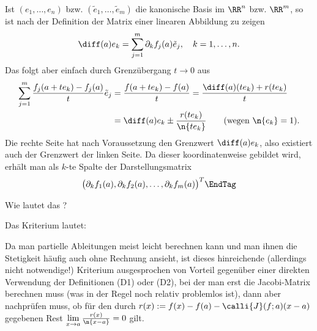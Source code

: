 \begin{antwort}
  Ist $( e_1,\ldots, e_n )$ bzw. $( \tilde{e}_1, \ldots , \tilde{e}_m )$ 
  die kanonische Basis im $\RR^n$ bzw. $\RR^m$, so ist nach der Definition 
  der Matrix einer linearen Abbildung zu zeigen
  \[
  \diff (a) e_k = \sum_{j=1}^m \partial_k f_j(a) \tilde{e}_j, \quad k=1,\ldots,n.
  \]
  Das folgt aber einfach durch Grenzübergang $t\to 0$ aus
  \begin{align*}
    \sum_{j=1}^m \frac{f_j(a+te_k)-f_j(a)}{t} \tilde{e}_j &= 
    \frac{f(a+te_k)-f(a)}{t} 
    = \frac{\diff (a)(te_k)+r(te_k)}{t} \\
    &= \diff (a)e_k \pm 
    \frac{ r(te_k) }{ \n{ t e_k } } \qquad\text{(wegen $\n{e_k}=1$)}. 
  \end{align*}
  Die rechte Seite hat nach Voraussetzung den Grenzwert $\diff (a) e_k$, also 
  existiert auch der Grenzwert der linken Seite. Da dieser koordinatenweise 
  gebildet wird, erhält man als $k$-te Spalte der Darstellungsmatrix
  \begin{equation}
    \big( \partial_k f_1(a), \partial_k f_2(a), \ldots, \partial_k f_m(a) \big)^T
    \EndTag
  \end{equation}
\end{antwort}



\begin{frage}
  \label{10_diffkrit}
  Wie lautet das ?
\end{frage}

\begin{antwort}
  Das Kriterium lautet:

  \medskip
  \noindent{}

  \medskip\noindent
  Da man partielle Ableitungen meist leicht berechnen kann und man ihnen 
  die Stetigkeit häufig auch ohne Rechnung ansieht, ist dieses hinreichende 
  (allerdings nicht notwendige!) Kriterium ausgesprochen von Vorteil 
  gegenüber einer direkten Verwendung der Definitionen 
  (D1) oder (D2), bei der man erst die Jacobi-Matrix berechnen muss 
  (was in der Regel noch relativ problemlos ist), dann aber nachprüfen 
  muss, ob für den durch $r(x):= f(x) -f(a)- \calli{J}(f;a) (x-a)$ 
  gegebenen Rest $\lim\limits_{x\to a}\frac{r(x)}{\n{ x-a }} =0$ gilt.
  \AntEnd  
\end{antwort}

